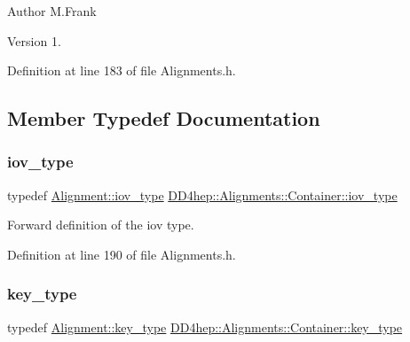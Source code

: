 \begin{DoxyAuthor}{Author}
M.\+Frank 
\end{DoxyAuthor}
\begin{DoxyVersion}{Version}
1. 
\end{DoxyVersion}


Definition at line 183 of file Alignments.\+h.



\subsection{Member Typedef Documentation}
\hypertarget{class_d_d4hep_1_1_alignments_1_1_container_a0da2fec1e4433deea86defda82886128}{}\label{class_d_d4hep_1_1_alignments_1_1_container_a0da2fec1e4433deea86defda82886128} 
\subsubsection{\texorpdfstring{iov\+\_\+type}{iov\_type}}
{\footnotesize\ttfamily typedef \hyperlink{class_d_d4hep_1_1_alignments_1_1_alignment_afd988c803da5a514d8fa255784f29462}{Alignment\+::iov\+\_\+type} \hyperlink{class_d_d4hep_1_1_alignments_1_1_container_a0da2fec1e4433deea86defda82886128}{D\+D4hep\+::\+Alignments\+::\+Container\+::iov\+\_\+type}}



Forward definition of the iov type. 



Definition at line 190 of file Alignments.\+h.

\hypertarget{class_d_d4hep_1_1_alignments_1_1_container_a4101ffa946cedbaf996682533e57c44e}{}\label{class_d_d4hep_1_1_alignments_1_1_container_a4101ffa946cedbaf996682533e57c44e} 
\subsubsection{\texorpdfstring{key\+\_\+type}{key\_type}}
{\footnotesize\ttfamily typedef \hyperlink{class_d_d4hep_1_1_alignments_1_1_alignment_ab824a65f935a0c79b9ea1a7a85014b88}{Alignment\+::key\+\_\+type} \hyperlink{class_d_d4hep_1_1_alignments_1_1_container_a4101ffa946cedbaf996682533e57c44e}{D\+D4hep\+::\+Alignments\+::\+Container\+::key\+\_\+type}}



